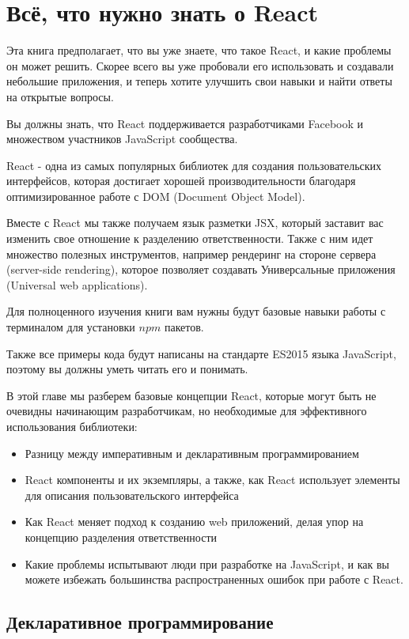 \chapter{Всё, что нужно знать о React}

Эта книга предполагает, что вы уже знаете, что такое React, и какие проблемы он может решить. Скорее всего вы уже пробовали его использовать и создавали небольшие приложения, и теперь хотите улучшить свои навыки и найти ответы на открытые вопросы.

Вы должны знать, что React поддерживается разработчиками Facebook и множеством участников JavaScript сообщества.

React - одна из самых популярных библиотек для создания пользовательских интерфейсов, которая достигает хорошей производительности благодаря оптимизированное работе с DOM (Document Object Model).

Вместе с React мы также получаем язык разметки JSX, который заставит вас изменить свое отношение к разделению ответственности. Также с ним идет множество полезных инструментов, например рендеринг на стороне сервера (server-side rendering), которое позволяет создавать Универсальные приложения (Universal web applications).

Для полноценного изучения книги вам нужны будут базовые навыки работы с терминалом для установки $npm$ пакетов.

Также все примеры кода будут написаны на стандарте ES2015 языка JavaScript, поэтому вы должны уметь читать его и понимать.

В этой главе мы разберем базовые концепции React, которые могут быть не очевидны начинающим разработчикам, но необходимые для эффективного использования библиотеки:

\begin{itemize}
  \item Разницу между императивным и декларативным программированием
  \item React компоненты и их экземпляры, а также, как React использует элементы для описания пользовательского интерфейса
  \item Как React меняет подход к созданию web приложений, делая упор на концепцию разделения ответственности
  \item Какие проблемы испытывают люди при разработке на JavaScript, и как вы можете избежать большинства распространенных ошибок при работе с React.
\end{itemize}


\section{Декларативное программирование}

